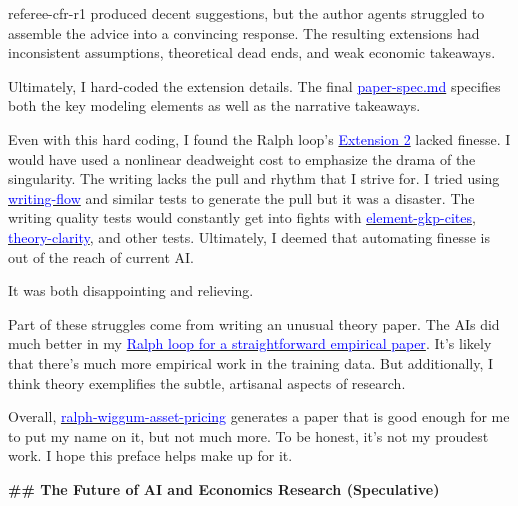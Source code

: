 \documentclass[12pt]{article}
\begin{document}
\begin{mdframed}[
linewidth=1pt,
linecolor=black,
innerleftmargin=0.25em,
innerrightmargin=0.25em,
innertopmargin=0.2\baselineskip,
innerbottommargin=0.8\baselineskip
]
\colorbox{gray!10}{\textcolor{red!70!black}{referee-cfr-r1}} produced decent suggestions, but the author agents struggled to assemble the advice into a convincing response. The resulting extensions had inconsistent assumptions, theoretical dead ends, and weak economic takeaways.

Ultimately, I hard-coded the extension details. The final \href{https://github.com/redacted/ralph-wiggum-asset-pricing/blob/main/spec/paper-spec.md}{\textcolor{blue}{paper-spec.md}} specifies both the key modeling elements as well as the narrative takeaways.

Even with this hard coding, I found the Ralph loop's \hyperref[sec:ext2]{\textcolor{blue}{Extension 2}} lacked finesse. I would have used a nonlinear deadweight cost to emphasize the drama of the singularity. The writing lacks the pull and rhythm that I strive for. I tried using \href{https://github.com/redacted/ralph-wiggum-asset-pricing/blob/0858ce2834650706baf808ec0452564005803a51/tests/writing-flow.py}{\textcolor{blue}{writing-flow}} and similar tests to generate the pull but it was a disaster. The writing quality tests would constantly get into fights with \href{https://github.com/redacted/ralph-wiggum-asset-pricing/blob/main/tests/element-gkp-cites.py}{\textcolor{blue}{element-gkp-cites}}, \href{https://github.com/redacted/ralph-wiggum-asset-pricing/blob/main/tests/theory-clarity.py}{\textcolor{blue}{theory-clarity}}, and other tests. Ultimately, I deemed that automating finesse is out of the reach of current AI.

It was both disappointing and relieving.

Part of these struggles come from writing an unusual theory paper. The AIs did much better in my \href{https://github.com/redacted/HumanxAI-ChenAY}{\textcolor{blue}{Ralph loop for a straightforward empirical paper}}. It's likely that there's much more empirical work in the training data. But additionally, I think theory exemplifies the subtle, artisanal aspects of research.

Overall, \href{https://github.com/redacted/ralph-wiggum-asset-pricing/tree/main}{\textcolor{blue}{ralph-wiggum-asset-pricing}} generates a paper that is good enough for me to put my name on it, but not much more. To be honest, it's not my proudest work. I hope this preface helps make up for it.

\par
{\large\bfseries \textcolor{red!70!black}{\#\# The Future of AI and Economics Research (Speculative)}}
\par


\end{mdframed}
\end{document}
